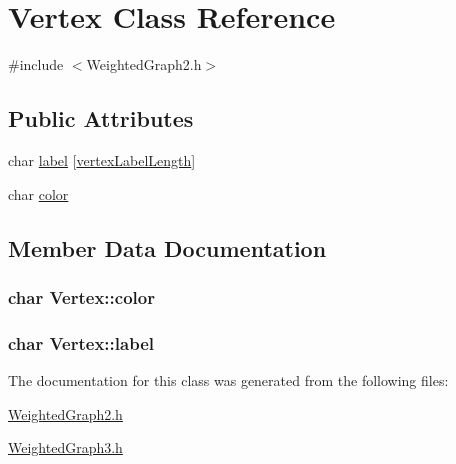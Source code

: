 \hypertarget{class_vertex}{\section{\-Vertex \-Class \-Reference}
\label{class_vertex}
}


{\ttfamily \#include $<$\-Weighted\-Graph2.\-h$>$}

\subsection*{\-Public \-Attributes}
\begin{DoxyCompactItemize}
\item 
char \hyperlink{class_vertex_a13fe33790b41909253d58bb546c4402f}{label} \mbox{[}\hyperlink{_weighted_graph3_8h_a4544df76d516b194b13a006d7942a190}{vertex\-Label\-Length}\mbox{]}
\item 
char \hyperlink{class_vertex_ab9455c96462d157dd94b7c1e7cdff135}{color}
\end{DoxyCompactItemize}


\subsection{\-Member \-Data \-Documentation}
\hypertarget{class_vertex_ab9455c96462d157dd94b7c1e7cdff135}{
\subsubsection[{color}]{\setlength{\rightskip}{0pt plus 5cm}char {\bf \-Vertex\-::color}}}\label{class_vertex_ab9455c96462d157dd94b7c1e7cdff135}
\hypertarget{class_vertex_a13fe33790b41909253d58bb546c4402f}{
\subsubsection[{label}]{\setlength{\rightskip}{0pt plus 5cm}char {\bf \-Vertex\-::label}}}\label{class_vertex_a13fe33790b41909253d58bb546c4402f}


\-The documentation for this class was generated from the following files\-:\begin{DoxyCompactItemize}
\item 
\hyperlink{_weighted_graph2_8h}{\-Weighted\-Graph2.\-h}\item 
\hyperlink{_weighted_graph3_8h}{\-Weighted\-Graph3.\-h}\end{DoxyCompactItemize}
